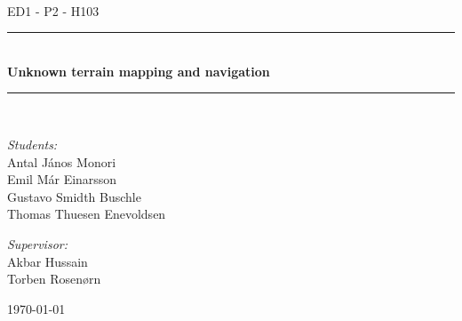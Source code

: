 \newcommand{\HRule}{\rule{\linewidth}{0.5 mm}}
\begin{titlepage}

\begin{center}
\\[0.5cm]

\textsc{\Large ED1 - P2 - H103}\\[0.6cm]

\HRule \\[0.9cm]
{ \Huge \bfseries Unknown terrain mapping and navigation }\\[0.4cm]

\HRule \\[0.5cm]


\begin{minipage}{0.49\textwidth}
\begin{flushleft} \large
\emph{Students:}\\
Antal János Monori\\
Emil Már Einarsson\\
Gustavo Smidth Buschle\\
Thomas Thuesen Enevoldsen
\end{flushleft}
\end{minipage}
\begin{minipage}{0.49\textwidth}
\begin{flushright} \large
\emph{Supervisor:} \\
Akbar Hussain\\
Torben Rosenørn
\end{flushright}
\end{minipage}

\vfill

{\large \today}



\end{center}

\end{titlepage}